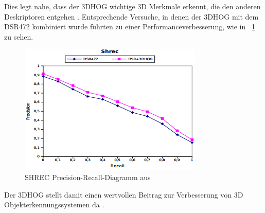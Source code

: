  Dies legt nahe, dass der 3DHOG wichtige 3D Merkmale erkennt, die den anderen Deskriptoren entgehen \cite{scherer2010histograms}.
\newline
Entsprechende Versuche, in denen der 3DHOG mit dem DSR472 kombiniert wurde führten zu einer Performanceverbesserung, wie in \figurename~\ref{SHREC_TEAM_3DHOG_DSR472} zu sehen. 

\begin{figure}[thpb]
	\centering
	\includegraphics[width=\linewidth]{2-Hauptteil/pics/SHREC_TEAM_3DHOG_DSR472.png}
	\caption{SHREC Precision-Recall-Diagramm aus \cite{scherer2010histograms}}
	\label{SHREC_TEAM_3DHOG_DSR472}
\end{figure}

Der 3DHOG stellt damit einen wertvollen Beitrag zur Verbesserung von 3D Objekterkennungssystemen da \cite{scherer2010histograms}.
